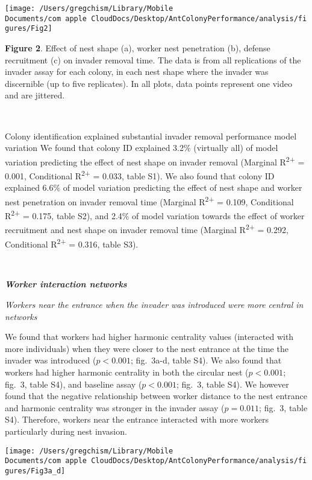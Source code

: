 \documentclass[3p]{elsarticle} %
\begin{document}
\begin{flushleft}\texttt{[image: /Users/gregchism/Library/Mobile Documents/com~apple~CloudDocs/Desktop/AntColonyPerformance/analysis/figures/Fig2]} \end{flushleft}

\textbf{Figure 2}. Effect of nest shape (a), worker nest penetration
(b), defense recruitment (c) on invader removal time. The data is from
all replications of the invader assay for each colony, in each nest
shape where the invader was discernible (up to five replicates). In all
plots, data points represent one video and are jittered.

~

Colony identification explained substantial invader removal performance
model variation We found that colony ID explained 3.2\% (virtually all)
of model variation predicting the effect of nest shape on invader
removal (Marginal R\textsuperscript{2+} = 0.001, Conditional
R\textsuperscript{2+} = 0.033, table S1). We also found that colony ID
explained 6.6\% of model variation predicting the effect of nest shape
and worker nest penetration on invader removal time (Marginal
R\textsuperscript{2+} = 0.109, Conditional R\textsuperscript{2+} =
0.175, table S2), and 2.4\% of model variation towards the effect of
worker recruitment and nest shape on invader removal time (Marginal
R\textsuperscript{2+} = 0.292, Conditional R\textsuperscript{2+} =
0.316, table S3).

~

\textbf{\emph{Worker interaction networks}}

\emph{Workers near the entrance when the invader was introduced were
more central in networks}

We found that workers had higher harmonic centrality values (interacted
with more individuals) when they were closer to the nest entrance at the
time the invader was introduced (\(p < 0.001\); fig.~3a-d, table S4). We
also found that workers had higher harmonic centrality in both the
circular nest (\(p < 0.001\); fig.~3, table S4), and baseline assay
(\(p < 0.001\); fig.~3, table S4). We however found that the negative
relationship between worker distance to the nest entrance and harmonic
centrality was stronger in the invader assay (\(p = 0.011\); fig.~3,
table S4). Therefore, workers near the entrance interacted with more
workers particularly during nest invasion.

\begin{flushleft}\texttt{[image: /Users/gregchism/Library/Mobile Documents/com~apple~CloudDocs/Desktop/AntColonyPerformance/analysis/figures/Fig3a\_d]} \end{flushleft}
\end{document}
